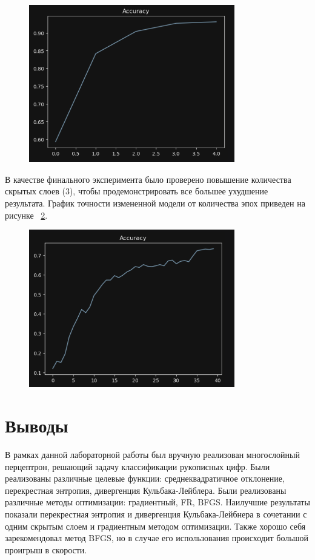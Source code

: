 \documentclass[a4paper, 14pt]{extarticle}
\begin{document}
\begin{figure}[H]
\centering
\includegraphics[width=0.8\textwidth]{images/res8.png}
\caption{}
\label{fig:img8}
\end{figure}


В качестве финального эксперимента было проверено повышение количества скрытых слоев (3), чтобы продемонстрировать все большее ухудшение результата. График точности измененной модели от количества эпох приведен на рисунке ~\ref{fig:img9}. 

\begin{figure}[H]
\centering
\includegraphics[width=0.8\textwidth]{images/res9.png}
\caption{}
\label{fig:img9}
\end{figure}


\section{Выводы}
В рамках данной лабораторной работы был вручную реализован многослойный перцептрон, решающий задачу классификации рукописных цифр. Были реализованы различные целевые функции: среднеквадратичное отклонение, перекрестная энтропия, дивергенция Кульбака-Лейблера. Были реализованы различные методы оптимизации: градиентный, FR, BFGS. Наилучшие результаты показали перекрестная энтропия и дивергенция Кульбака-Лейбнера в сочетании с одним скрытым слоем и градиентным методом оптимизации. Также хорошо себя зарекомендовал метод BFGS, но в случае его использования происходит большой проигрыш в скорости.
\end{document}
